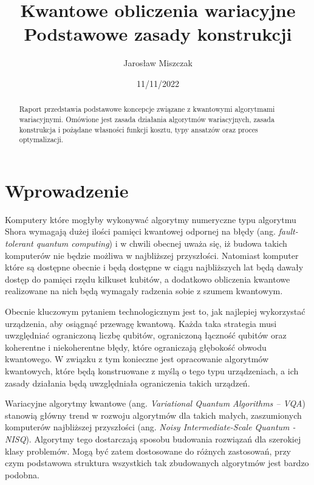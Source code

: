 \documentclass[a4paper,11pt]{article}
\newcommand{\ang}[1]{(ang. \emph{#1})}
\begin{document}
\title{Kwantowe obliczenia wariacyjne\\ {\normalsize Podstawowe zasady konstrukcji}}

\author{Jarosław Miszczak}
\date{11/11/2022}

\maketitle

\begin{abstract}
Raport przedstawia podstawowe koncepcje związane z kwantowymi algorytmami wariacyjnymi. Omówione jest zasada działania algorytmów wariacyjnych, zasada konstrukcja i pożądane własności funkcji kosztu, typy ansatzów oraz proces optymalizacji.
\end{abstract}


\hypertarget{wprowadzenie}{%
\section{Wprowadzenie}\label{wprowadzenie}}

Komputery które mogłyby wykonywać algorytmy numeryczne typu algorytmu Shora wymagają dużej ilości pamięci kwantowej odpornej na błędy \ang{fault-tolerant quantum computing} i w chwili obecnej uważa się, iż budowa takich komputerów nie będzie możliwa w najbliższej przyszłości. Natomiast komputer które są dostępne obecnie i będą dostępne w ciągu najbliższych lat będą dawały dostęp do pamięci rzędu kilkuset kubitów, a dodatkowo obliczenia kwantowe realizowane na nich będą wymagały radzenia sobie z szumem kwantowym. 
 
Obecnie kluczowym pytaniem technologicznym jest to, jak najlepiej wykorzystać  urządzenia, aby osiągnąć przewagę kwantową. Każda taka strategia musi uwzględniać ograniczoną liczbę qubitów, ograniczoną łączność qubitów oraz koherentne i niekoherentne błędy, które ograniczają głębokość obwodu kwantowego. W związku z tym konieczne jest opracowanie algorytmów kwantowych, które będą konstruowane z myślą o tego typu urządzeniach, a ich zasady działania będą uwzględniała ograniczenia takich urządzeń.
 
Wariacyjne algorytmy kwantowe \ang{Variational Quantum Algorithms -- VQA} stanowią główny trend w rozwoju algorytmów dla takich małych, zaszumionych komputerów najbliższej przyszłości \ang{Noisy Intermediate-Scale Quantum - NISQ}. Algorytmy tego dostarczają sposobu budowania rozwiązań dla szerokiej klasy problemów. Mogą być zatem dostosowane do różnych zastosowań, przy czym podstawowa struktura wszystkich tak zbudowanych algorytmów jest bardzo podobna.
\end{document}
